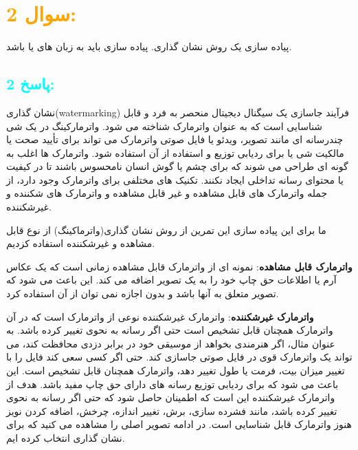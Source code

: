 \section*{\textcolor{orange}{سوال 2:}}
پیاده سازی یک روش نشان گذاری. پیاده سازی باید به زبان های  یا  باشد.
\subsection*{\textcolor{cyan}{پاسخ 2:}}
نشان گذاری(watermarking) فرآیند جاسازی یک سیگنال دیجیتال منحصر به فرد و قابل شناسایی است که به عنوان واترمارک شناخته می‌ شود. واترمارکینگ در یک شی‌ چندرسانه ای مانند تصویر، ویدئو یا فایل صوتی‌ واترمارک می‌ تواند برای تأیید صحت یا مالکیت شی‌ یا برای ردیابی توزیع و استفاده از آن استفاده شود. واترمارک ها اغلب به گونه ای طراحی‌ می‌ شوند که برای چشم یا گوش انسان نامحسوس باشند تا در کیفیت یا محتوای رسانه تداخلی‌ ایجاد نکنند. تکنیک های مختلفی‌ برای واترمارک وجود دارد، از جمله واترمارک های قابل مشاهده و غیر قابل مشاهده و واترمارک های شکننده و غیرشکننده.

ما برای این پیاده سازی این تمرین از روش نشان گذاری(واترماکینگ) از نوع قابل مشاهده و غیرشکننده استفاده کزدیم. 

\textbf{واترمارک قابل مشاهده}: نمونه ای از واترمارک قابل مشاهده زمانی‌ است که یک عکاس آرم یا اطلاعات حق چاپ خود را به یک تصویر اضافه می‌ کند. این باعث می‌ شود که تصویر متعلق به آنها باشد و بدون اجازه نمی‌ توان از آن استفاده کرد.

\textbf{واترمارک غیرشکننده}: واترمارک غیرشکننده نوعی‌ از واترمارک است که در آن واترمارک همچنان قابل تشخیص است حتی‌ اگر رسانه به نحوی تغییر کرده باشد. به عنوان مثال، اگر هنرمندی بخواهد از موسیقی‌ خود در برابر دزدی محافظت کند، می‌ تواند یک واترمارک قوی در فایل صوتی‌ جاسازی کند. حتی‌ اگر کسی‌ سعی‌ کند فایل را با تغییر میزان بیت، فرمت یا طول تغییر دهد، واترمارک همچنان قابل تشخیص است. این باعث می‌ شود که برای ردیابی توزیع رسانه های دارای حق چاپ مفید باشد. هدف از واترمارک غیرشکننده این است که اطمینان حاصل شود که حتی‌ اگر رسانه به نحوی تغییر کرده باشد، مانند فشردە سازی، برش، تغییر اندازه، چرخش، اضافه کردن نویز هنوز واترمارک قابل شناسایی است.
در ادامه تصویر اصلی را مشاهده می کنید که برای نشان گذاری انتخاب کرده ایم.



